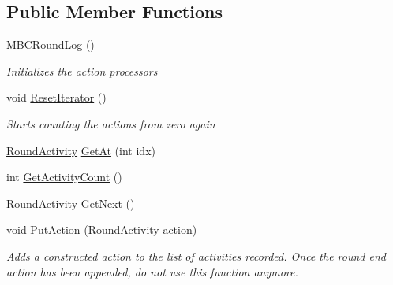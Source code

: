 \subsection*{Public Member Functions}
\begin{DoxyCompactItemize}
\item 
\hypertarget{class_m_b_c_1_1_core_1_1_m_b_c_round_log_a2b59066ab5e6f4ba5ead5a4626e48b2a}{\hyperlink{class_m_b_c_1_1_core_1_1_m_b_c_round_log_a2b59066ab5e6f4ba5ead5a4626e48b2a}{M\-B\-C\-Round\-Log} ()}\label{class_m_b_c_1_1_core_1_1_m_b_c_round_log_a2b59066ab5e6f4ba5ead5a4626e48b2a}

\begin{DoxyCompactList}\small\item\em Initializes the action processors\end{DoxyCompactList}\item 
\hypertarget{class_m_b_c_1_1_core_1_1_m_b_c_round_log_a8db7abf00ac1d6cb774c599c8b7d049b}{void \hyperlink{class_m_b_c_1_1_core_1_1_m_b_c_round_log_a8db7abf00ac1d6cb774c599c8b7d049b}{Reset\-Iterator} ()}\label{class_m_b_c_1_1_core_1_1_m_b_c_round_log_a8db7abf00ac1d6cb774c599c8b7d049b}

\begin{DoxyCompactList}\small\item\em Starts counting the actions from zero again\end{DoxyCompactList}\item 
\hyperlink{class_m_b_c_1_1_core_1_1_m_b_c_round_log_1_1_round_activity}{Round\-Activity} \hyperlink{class_m_b_c_1_1_core_1_1_m_b_c_round_log_afd440767fa7dd1531dc49e7c0b230e10}{Get\-At} (int idx)
\item 
int \hyperlink{class_m_b_c_1_1_core_1_1_m_b_c_round_log_abb343806bf5ec1a63c644ce046ebb8c7}{Get\-Activity\-Count} ()
\item 
\hyperlink{class_m_b_c_1_1_core_1_1_m_b_c_round_log_1_1_round_activity}{Round\-Activity} \hyperlink{class_m_b_c_1_1_core_1_1_m_b_c_round_log_a480f8cb584ec0c1d066de92fc8bc4ac9}{Get\-Next} ()
\item 
\hypertarget{class_m_b_c_1_1_core_1_1_m_b_c_round_log_a39526d77593e595ecbf00f97f4a5f5e7}{void \hyperlink{class_m_b_c_1_1_core_1_1_m_b_c_round_log_a39526d77593e595ecbf00f97f4a5f5e7}{Put\-Action} (\hyperlink{class_m_b_c_1_1_core_1_1_m_b_c_round_log_1_1_round_activity}{Round\-Activity} action)}\label{class_m_b_c_1_1_core_1_1_m_b_c_round_log_a39526d77593e595ecbf00f97f4a5f5e7}

\begin{DoxyCompactList}\small\item\em Adds a constructed action to the list of activities recorded. Once the round end action has been appended, do not use this function anymore.\end{DoxyCompactList}\end{DoxyCompactItemize}


